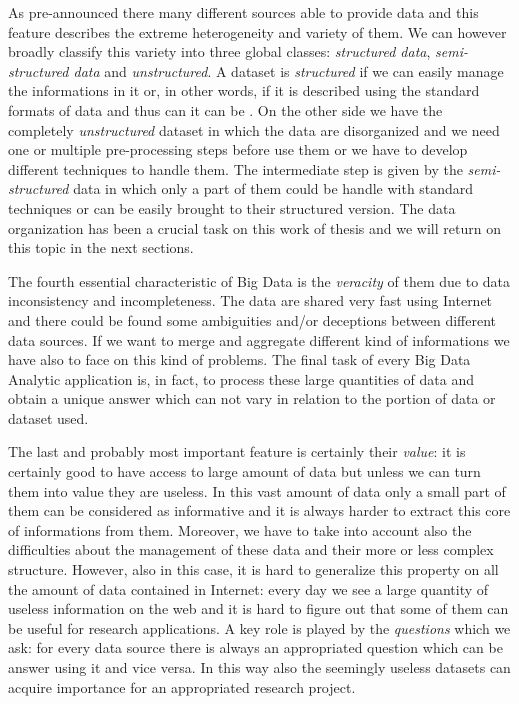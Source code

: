 \documentclass{standalone}
\begin{document}
As pre-announced there many different sources able to provide data and this feature describes the extreme heterogeneity and variety of them.
We can however broadly classify this variety into three global classes: \emph{structured data}, \emph{semi-structured data} and \emph{unstructured}.
A dataset is \emph{structured} if we can easily manage the informations in it or, in other words, if it is described using the standard formats of data and thus can it can be .
On the other side we have the completely \emph{unstructured} dataset in which the data are disorganized and we need one or multiple pre-processing steps before use them or we have to develop different techniques to handle them.
The intermediate step is given by the \emph{semi-structured} data in which only a part of them could be handle with standard techniques or can be easily brought to their structured version.
The data organization has been a crucial task on this work of thesis and we will return on this topic in the next sections.

The fourth essential characteristic of Big Data is the \emph{veracity} of them due to data inconsistency and incompleteness.
The data are shared very fast using Internet and there could be found some ambiguities and/or deceptions between different data sources.
If we want to merge and aggregate different kind of informations we have also to face on this kind of problems.
The final task of every Big Data Analytic application is, in fact, to process these large quantities of data and obtain a unique answer which can not vary in relation to the portion of data or dataset used.

The last and probably most important feature is certainly their \emph{value}: it is certainly good to have access to large amount of data but unless we can turn them into value they are useless.
In this vast amount of data only a small part of them can be considered as informative and it is always harder to extract this core of informations from them.
Moreover, we have to take into account also the difficulties about the management of these data and their more or less complex structure.
However, also in this case, it is hard to generalize this property on all the amount of data contained in Internet: every day we see a large quantity of useless information on the web and it is hard to figure out that some of them can be useful for research applications.
A key role is played by the \emph{questions} which we ask: for every data source there is always an appropriated question which can be answer using it and vice versa.
In this way also the seemingly useless datasets can acquire importance for an appropriated research project.
\end{document}

